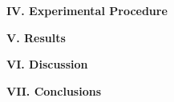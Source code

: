 \documentclass[fleqn]{article}
\begin{document}
  \vspace{10px}

  
  \vspace{20px}




  \textbf{IV. Experimental Procedure}

  \vspace{10px}

  
  \vspace{20px}





  \textbf{V. Results}

  \vspace{10px}

  
  \vspace{20px}




  \textbf{VI. Discussion}

  \vspace{10px}

  
  \vspace{20px}



  \textbf{VII. Conclusions}

  \vspace{10px}

  
  \vspace{20px}

  \printbibliography
\end{document}
